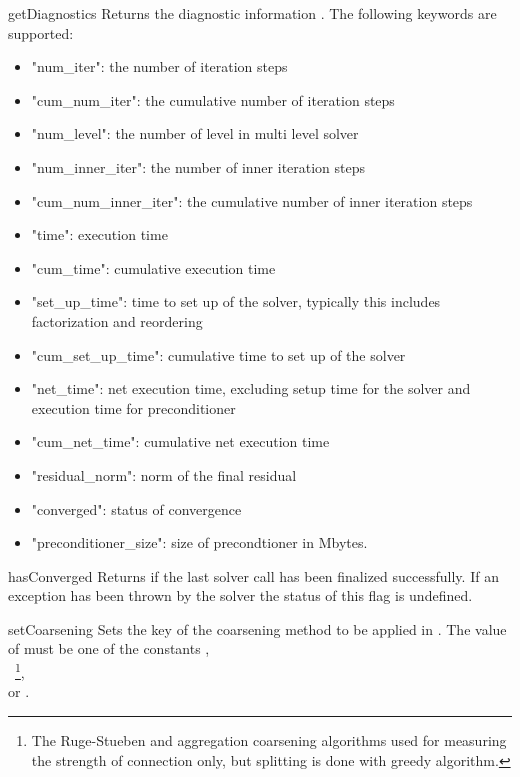 \begin{methoddesc}[SolverOptions]{getDiagnostics}{}
Returns the diagnostic information . The following keywords are
supported:
\begin{itemize}
 \item "num_iter": the number of iteration steps
 \item "cum_num_iter": the cumulative number of iteration steps
 \item "num_level": the number of level in multi level solver
 \item "num_inner_iter": the number of inner iteration steps
 \item"cum_num_inner_iter": the cumulative number of inner iteration steps
 \item"time": execution time 
 \item "cum_time": cumulative execution time
 \item "set_up_time": time to set up of the solver, typically this includes factorization and reordering
 \item "cum_set_up_time": cumulative time to set up of the solver
 \item "net_time": net execution time, excluding setup time for the solver and execution time for preconditioner
 \item "cum_net_time": cumulative net execution time
 \item "residual_norm": norm of the final residual
 \item "converged": status of convergence
\item "preconditioner_size": size of precondtioner in Mbytes.  
\end{itemize}
\end{methoddesc}


\begin{methoddesc}[SolverOptions]{hasConverged}{}
Returns \True if the last solver call has been finalized successfully.
If an exception has been thrown by the solver the status of this flag is undefined.
\end{methoddesc}

\begin{methoddesc}[SolverOptions]{setCoarsening}{}
Sets the key of the coarsening method to be applied in \AMG.
The value of  must be one of the constants
, \\
~\footnote{The Ruge-Stueben and aggregation coarsening algorithms used for measuring the strength of connection only, but splitting is done with greedy algorithm.}, \\or {}.
\end{methoddesc}

